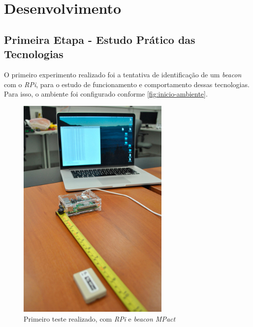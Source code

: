 \documentclass[
		12pt,				%
		openright,			%
		oneside,			%
		a4paper,			%
		chapter=TITLE,		%
		english,			%
		brazil				%
	]{abntex2}
\begin{document}
\chapter{Desenvolvimento}\label{cap:desenvolvimento}

\section{Primeira Etapa - Estudo Prático das Tecnologias}\label{sec:primeira-etapa}

O primeiro experimento realizado foi a tentativa de identificação de um \textit{beacon} com o \textit{RPi}, para o estudo de funcionamento e comportamento dessas tecnologias. Para isso, o ambiente foi configurado conforme \autoref{fig:inicio-ambiente}. 

\begin{figure}[htb]
	\caption{\label{fig:inicio-ambiente}Primeiro teste realizado, com \textit{RPi} e \textit{beacon MPact}}
	\begin{center}
		\includegraphics[width=0.66\textwidth]{img/ambiente1.jpg}
	\end{center}
\end{figure}
\end{document}
